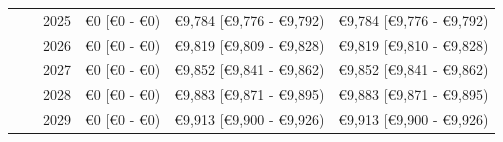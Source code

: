 \documentclass[
]{article}
\begin{document}
\begin{landscape}
\begin{longtable}[t]{llrlll}
\cmidrule{3-6}\nopagebreak
\hspace{1em} &  & 2025 & €0 [€0 - €0) & €9,784 [€9,776 - €9,792) & €9,784 [€9,776 - €9,792)\\
\cmidrule{3-6}\nopagebreak
\hspace{1em} &  & 2026 & €0 [€0 - €0) & €9,819 [€9,809 - €9,828) & €9,819 [€9,810 - €9,828)\\
\cmidrule{3-6}\nopagebreak
\hspace{1em} &  & 2027 & €0 [€0 - €0) & €9,852 [€9,841 - €9,862) & €9,852 [€9,841 - €9,862)\\
\cmidrule{3-6}\nopagebreak
\hspace{1em} &  & 2028 & €0 [€0 - €0) & €9,883 [€9,871 - €9,895) & €9,883 [€9,871 - €9,895)\\
\cmidrule{3-6}\nopagebreak
\hspace{1em} &  & 2029 & €0 [€0 - €0) & €9,913 [€9,900 - €9,926) & €9,913 [€9,900 - €9,926)\\*
\end{longtable}
\endgroup{}
\end{landscape}
\end{document}
